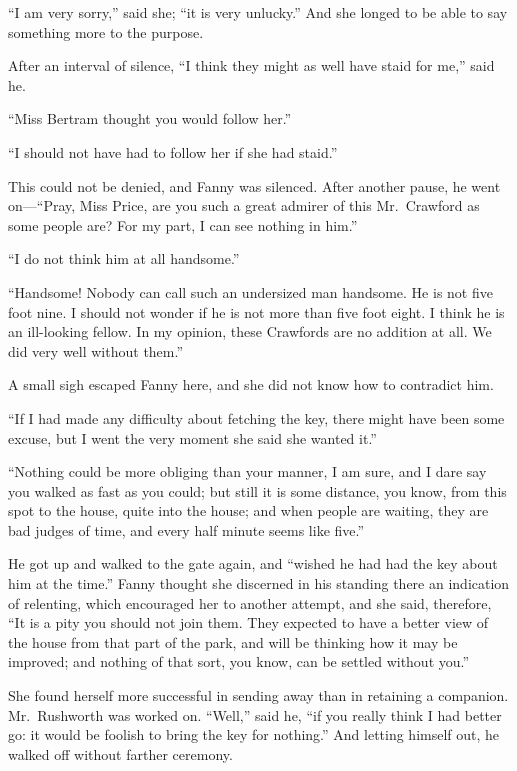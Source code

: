 ``I am very sorry,'' said she; ``it is very unlucky.''  And she
longed to be able to say something more to the purpose.

After an interval of silence, ``I think they might as well
have staid for me,'' said he.

``Miss Bertram thought you would follow her.''

``I should not have had to follow her if she had staid.''

This could not be denied, and Fanny was silenced.
After another pause, he went on---``Pray, Miss Price,
are you such a great admirer of this Mr.\ Crawford as some
people are?  For my part, I can see nothing in him.''

``I do not think him at all handsome.''

``Handsome!  Nobody can call such an undersized man handsome.
He is not five foot nine.  I should not wonder if he is not more
than five foot eight.  I think he is an ill-looking fellow.
In my opinion, these Crawfords are no addition at all.
We did very well without them.''

A small sigh escaped Fanny here, and she did not know
how to contradict him.

``If I had made any difficulty about fetching the key,
there might have been some excuse, but I went the very
moment she said she wanted it.''

``Nothing could be more obliging than your manner, I am sure,
and I dare say you walked as fast as you could; but still
it is some distance, you know, from this spot to the house,
quite into the house; and when people are waiting,
they are bad judges of time, and every half minute seems
like five.''

He got up and walked to the gate again, and ``wished he
had had the key about him at the time.''  Fanny thought she
discerned in his standing there an indication of relenting,
which encouraged her to another attempt, and she said,
therefore, ``It is a pity you should not join them.
They expected to have a better view of the house from
that part of the park, and will be thinking how it
may be improved; and nothing of that sort, you know,
can be settled without you.''

She found herself more successful in sending away than
in retaining a companion.  Mr.\ Rushworth was worked on.
``Well,'' said he, ``if you really think I had better go:
it would be foolish to bring the key for nothing.''
And letting himself out, he walked off without farther
ceremony.

